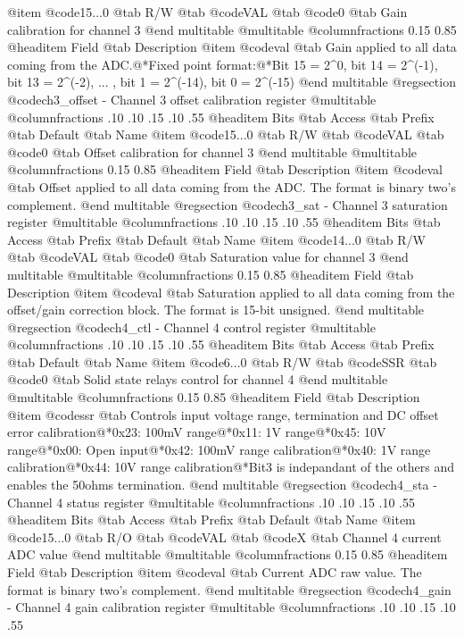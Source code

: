 @item @code{15...0}
@tab R/W @tab
@code{VAL}
@tab @code{0} @tab 
Gain calibration for channel 3
@end multitable
@multitable @columnfractions 0.15 0.85
@headitem Field @tab Description
@item @code{val} @tab Gain applied to all data coming from the ADC.@*Fixed point format:@*Bit 15 = 2^0, bit 14 = 2^(-1), bit 13 = 2^(-2), ... , bit 1 = 2^(-14), bit 0 = 2^(-15)
@end multitable
@regsection @code{ch3_offset} - Channel 3 offset calibration register
@multitable @columnfractions .10 .10 .15 .10 .55
@headitem Bits @tab Access @tab Prefix @tab Default @tab Name
@item @code{15...0}
@tab R/W @tab
@code{VAL}
@tab @code{0} @tab 
Offset calibration for channel 3
@end multitable
@multitable @columnfractions 0.15 0.85
@headitem Field @tab Description
@item @code{val} @tab Offset applied to all data coming from the ADC. The format is binary two's complement.
@end multitable
@regsection @code{ch3_sat} - Channel 3 saturation register
@multitable @columnfractions .10 .10 .15 .10 .55
@headitem Bits @tab Access @tab Prefix @tab Default @tab Name
@item @code{14...0}
@tab R/W @tab
@code{VAL}
@tab @code{0} @tab 
Saturation value for channel 3
@end multitable
@multitable @columnfractions 0.15 0.85
@headitem Field @tab Description
@item @code{val} @tab Saturation applied to all data coming from the offset/gain correction block. The format is 15-bit unsigned.
@end multitable
@regsection @code{ch4_ctl} - Channel 4 control register
@multitable @columnfractions .10 .10 .15 .10 .55
@headitem Bits @tab Access @tab Prefix @tab Default @tab Name
@item @code{6...0}
@tab R/W @tab
@code{SSR}
@tab @code{0} @tab 
Solid state relays control for channel 4
@end multitable
@multitable @columnfractions 0.15 0.85
@headitem Field @tab Description
@item @code{ssr} @tab Controls input voltage range, termination and DC offset error calibration@*0x23: 100mV range@*0x11: 1V range@*0x45: 10V range@*0x00: Open input@*0x42: 100mV range calibration@*0x40: 1V range calibration@*0x44: 10V range calibration@*Bit3 is indepandant of the others and enables the 50ohms termination.
@end multitable
@regsection @code{ch4_sta} - Channel 4 status register
@multitable @columnfractions .10 .10 .15 .10 .55
@headitem Bits @tab Access @tab Prefix @tab Default @tab Name
@item @code{15...0}
@tab R/O @tab
@code{VAL}
@tab @code{X} @tab 
Channel 4 current ADC value
@end multitable
@multitable @columnfractions 0.15 0.85
@headitem Field @tab Description
@item @code{val} @tab Current ADC raw value. The format is binary two's complement.
@end multitable
@regsection @code{ch4_gain} - Channel 4 gain calibration register
@multitable @columnfractions .10 .10 .15 .10 .55
